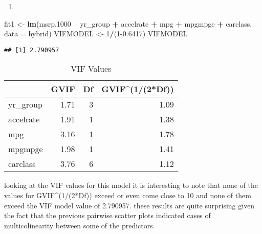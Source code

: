 \documentclass[]{article}
\newenvironment{Shaded}{\begin{snugshade}}{\end{snugshade}}
\newcommand{\DataTypeTok}[1]{\textcolor[rgb]{0.13,0.29,0.53}{#1}}
\newcommand{\DecValTok}[1]{\textcolor[rgb]{0.00,0.00,0.81}{#1}}
\newcommand{\FloatTok}[1]{\textcolor[rgb]{0.00,0.00,0.81}{#1}}
\newcommand{\KeywordTok}[1]{\textcolor[rgb]{0.13,0.29,0.53}{\textbf{#1}}}
\newcommand{\NormalTok}[1]{#1}
\newcommand{\OperatorTok}[1]{\textcolor[rgb]{0.81,0.36,0.00}{\textbf{#1}}}
\newcommand{\StringTok}[1]{\textcolor[rgb]{0.31,0.60,0.02}{#1}}
\begin{document}
\begin{enumerate}
\def\labelenumi{\Alph{enumi})}
\setcounter{enumi}{3}
\item
\end{enumerate}

\begin{Shaded}
\begin{Highlighting}[]
\NormalTok{fit1 <-}\StringTok{ }\KeywordTok{lm}\NormalTok{(msrp}\FloatTok{.1000} \OperatorTok{~}\StringTok{ }\NormalTok{yr_group }\OperatorTok{+}\StringTok{ }\NormalTok{accelrate }\OperatorTok{+}\StringTok{ }\NormalTok{mpg }\OperatorTok{+}\StringTok{ }\NormalTok{mpgmpge }\OperatorTok{+}\StringTok{ }\NormalTok{carclass, }\DataTypeTok{data =}\NormalTok{ hybrid)}
\NormalTok{VIFMODEL <-}\StringTok{ }\DecValTok{1}\OperatorTok{/}\NormalTok{(}\DecValTok{1}\FloatTok{-0.6417}\NormalTok{)}
\NormalTok{VIFMODEL}
\end{Highlighting}
\end{Shaded}

\begin{verbatim}
## [1] 2.790957
\end{verbatim}

\begin{Shaded}
\end{Shaded}

\begin{table}[t]

\caption{\label{tab:unnamed-chunk-6}VIF Values}
\centering
\begin{tabular}{l|r|r|r}
\hline
  & GVIF & Df & GVIF\textasciicircum{}(1/(2*Df))\\
\hline
yr\_group & 1.71 & 3 & 1.09\\
\hline
accelrate & 1.91 & 1 & 1.38\\
\hline
mpg & 3.16 & 1 & 1.78\\
\hline
mpgmpge & 1.98 & 1 & 1.41\\
\hline
carclass & 3.76 & 6 & 1.12\\
\hline
\end{tabular}
\end{table}

looking at the VIF values for this model it is interesting to note that
none of the values for GVIF\^{}(1/(2*Df)) exceed or even come close to
10 and none of them exceed the VIF model value of 2.790957. these
results are quite surprising given the fact that the previous pairwise
scatter plots indicated cases of multicolinearity between some of the
predictors.
\end{document}
